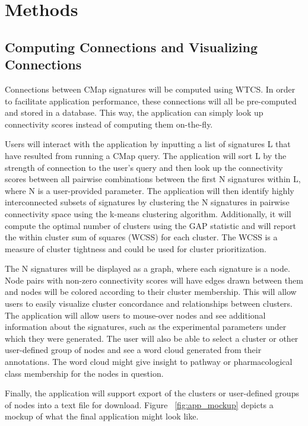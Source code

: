 \documentclass[12pt]{article}
\begin{document}
\section{Methods}
\subsection{Computing Connections and Visualizing Connections}

Connections between CMap signatures will be computed using WTCS. In order to facilitate application performance, these connections will all be pre-computed and stored in a database. This way, the application can simply look up connectivity scores instead of computing them on-the-fly.

Users will interact with the application by inputting a list of signatures L that have resulted from running a CMap query. The application will sort L by the strength of connection to the user's query and then look up the connectivity scores between all pairwise combinations between the first N signatures within L, where N is a user-provided parameter. The application will then identify highly interconnected subsets of signatures by clustering the N signatures in pairwise connectivity space using the k-means clustering algorithm\cite{lloyd_least_squares_1982}. Additionally, it will compute the optimal number of clusters using the GAP statistic and will report the within cluster sum of squares (WCSS) for each cluster. The WCSS is a measure of cluster tightness and could be used for cluster prioritization.

The N signatures will be displayed as a graph, where each signature is a node. Node pairs with non-zero connectivity scores will have edges drawn between them and nodes will be colored according to their cluster membership. This will allow users to easily visualize cluster concordance and relationships between clusters. The application will allow users to mouse-over nodes and see additional information about the signatures, such as the experimental parameters under which they were generated. The user will also be able to select a cluster or other user-defined group of nodes and see a word cloud generated from their annotations. The word cloud might give insight to pathway or pharmacological class membership for the nodes in question.

Finally, the application will support export of the clusters or user-defined groups of nodes into a text file for download. Figure ~\ref{fig:app_mockup} depicts a mockup of what the final application might look like.
\end{document}
